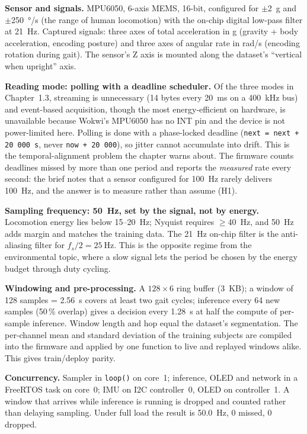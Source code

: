 \documentclass[10pt,a4paper]{article}
\begin{document}
\textbf{Sensor and signals.} MPU6050, 6-axis MEMS, 16-bit, configured for $\pm$\SI{2}{g} and $\pm$\SI{250}{\degree/s} (the range of human locomotion) with the on-chip digital low-pass filter at \SI{21}{\hertz}. Captured signals: three axes of total acceleration in g (gravity + body acceleration, encoding posture) and three axes of angular rate in rad/s (encoding rotation during gait). The sensor's Z axis is mounted along the dataset's ``vertical when upright'' axis.

\textbf{Reading mode: polling with a deadline scheduler.} Of the three modes in Chapter~1.3, streaming is unnecessary (14 bytes every \SI{20}{ms} on a \SI{400}{kHz} bus) and event-based acquisition, though the most energy-efficient on hardware, is unavailable because Wokwi's MPU6050 has no INT pin and the device is not power-limited here. Polling is done with a phase-locked deadline (\texttt{next = next + 20\,000\,\textmu s}, never \texttt{now + 20\,000}), so jitter cannot accumulate into drift. This is the temporal-alignment problem the chapter warns about. The firmware counts deadlines missed by more than one period and reports the \emph{measured} rate every second: the brief notes that a sensor configured for \SI{100}{\hertz} rarely delivers \SI{100}{\hertz}, and the answer is to measure rather than assume (H1).

\textbf{Sampling frequency: \SI{50}{\hertz}, set by the signal, not by energy.} Locomotion energy lies below 15--\SI{20}{\hertz}; Nyquist requires $\geq$\SI{40}{\hertz}, and \SI{50}{\hertz} adds margin and matches the training data. The \SI{21}{\hertz} on-chip filter is the anti-aliasing filter for $f_s/2=\SI{25}{\hertz}$. This is the opposite regime from the environmental topic, where a slow signal lets the period be chosen by the energy budget through duty cycling.

\textbf{Windowing and pre-processing.} A $128\times6$ ring buffer (\SI{3}{KB}); a window of 128 samples = \SI{2.56}{s} covers at least two gait cycles; inference every 64 new samples (50\,\% overlap) gives a decision every \SI{1.28}{s} at half the compute of per-sample inference. Window length and hop equal the dataset's segmentation. The per-channel mean and standard deviation of the training subjects are compiled into the firmware and applied by one function to live and replayed windows alike. This gives train/deploy parity.

\textbf{Concurrency.} Sampler in \texttt{loop()} on core~1; inference, OLED and network in a FreeRTOS task on core~0; IMU on I2C controller~0, OLED on controller~1. A window that arrives while inference is running is dropped and counted rather than delaying sampling. Under full load the result is \SI{50.0}{\hertz}, 0 missed, 0 dropped.
\end{document}
